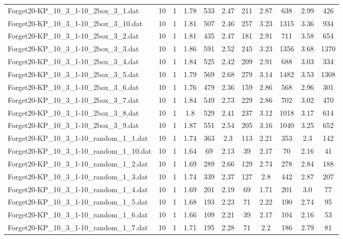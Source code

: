 \begin{table}[!ht]
\begin{tabular}{lcccccccccc}
Forget20-KP\_10\_3\_1-10\_2box\_3\_1.dat & 10 & 1 & 1.78 & 533 & 2.47 & 211 & 2.87 & 638 & 2.99 & 426 \\
Forget20-KP\_10\_3\_1-10\_2box\_3\_10.dat & 10 & 1 & 1.81 & 507 & 2.46 & 257 & 3.23 & 1315 & 3.36 & 934 \\
Forget20-KP\_10\_3\_1-10\_2box\_3\_2.dat & 10 & 1 & 1.81 & 435 & 2.47 & 181 & 2.91 & 711 & 3.58 & 654 \\
Forget20-KP\_10\_3\_1-10\_2box\_3\_3.dat & 10 & 1 & 1.86 & 591 & 2.52 & 245 & 3.23 & 1356 & 3.68 & 1370 \\
Forget20-KP\_10\_3\_1-10\_2box\_3\_4.dat & 10 & 1 & 1.84 & 525 & 2.42 & 209 & 2.91 & 688 & 3.03 & 334 \\
Forget20-KP\_10\_3\_1-10\_2box\_3\_5.dat & 10 & 1 & 1.79 & 569 & 2.68 & 279 & 3.14 & 1482 & 3.53 & 1308 \\
Forget20-KP\_10\_3\_1-10\_2box\_3\_6.dat & 10 & 1 & 1.76 & 479 & 2.36 & 159 & 2.86 & 568 & 2.96 & 301 \\
Forget20-KP\_10\_3\_1-10\_2box\_3\_7.dat & 10 & 1 & 1.84 & 549 & 2.73 & 229 & 2.86 & 702 & 3.02 & 470 \\
Forget20-KP\_10\_3\_1-10\_2box\_3\_8.dat & 10 & 1 & 1.8 & 529 & 2.41 & 237 & 3.12 & 1018 & 3.17 & 614 \\
Forget20-KP\_10\_3\_1-10\_2box\_3\_9.dat & 10 & 1 & 1.87 & 551 & 2.54 & 205 & 3.16 & 1040 & 3.25 & 652 \\
Forget20-KP\_10\_3\_1-10\_random\_1\_1.dat & 10 & 1 & 1.74 & 363 & 2.3 & 113 & 2.21 & 353 & 2.3 & 142 \\
Forget20-KP\_10\_3\_1-10\_random\_1\_10.dat & 10 & 1 & 1.64 & 69 & 2.13 & 39 & 2.17 & 70 & 2.16 & 41 \\
Forget20-KP\_10\_3\_1-10\_random\_1\_2.dat & 10 & 1 & 1.69 & 289 & 2.66 & 129 & 2.74 & 278 & 2.84 & 188 \\
Forget20-KP\_10\_3\_1-10\_random\_1\_3.dat & 10 & 1 & 1.74 & 339 & 2.37 & 127 & 2.8 & 442 & 2.87 & 207 \\
Forget20-KP\_10\_3\_1-10\_random\_1\_4.dat & 10 & 1 & 1.69 & 201 & 2.19 & 69 & 1.71 & 201 & 3.0 & 77 \\
Forget20-KP\_10\_3\_1-10\_random\_1\_5.dat & 10 & 1 & 1.68 & 193 & 2.23 & 71 & 2.22 & 190 & 2.74 & 95 \\
Forget20-KP\_10\_3\_1-10\_random\_1\_6.dat & 10 & 1 & 1.66 & 109 & 2.21 & 39 & 2.17 & 104 & 2.16 & 53 \\
Forget20-KP\_10\_3\_1-10\_random\_1\_7.dat & 10 & 1 & 1.71 & 195 & 2.28 & 71 & 2.2 & 186 & 2.79 & 81 \\

\end{tabular}
\end{table}
